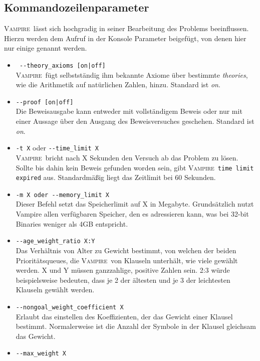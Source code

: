 \documentclass{article}
\newcommand{\vampire}{\textsc{Vampire}~}
\begin{document}
\subsection{Kommandozeilenparameter}
\label{subsec:commands}
\vampire lässt sich hochgradig in seiner Bearbeitung des Problems beeinflussen. Hierzu werden dem Aufruf in der Konsole Parameter beigefügt, von denen hier nur einige genannt werden.
\begin{itemize}
	\item \verb= --theory_axioms [on|off]= \label{arg:theoryaxiomsoff}\\
	\vampire fügt selbstständig ihm bekannte Axiome über bestimmte \emph{theories}, wie die Arithmetik auf natürlichen Zahlen, hinzu. Standard ist \textit{on}.
	\item \verb=--proof [on|off]= \label{arg:proofoff}\\
	Die Beweisausgabe kann entweder mit vollständigem Beweis oder nur mit einer Aussage über den Ausgang des Beweisversuches geschehen. Standard ist \textit{on}.
	\item \verb|-t X| oder \verb|--time_limit X| \label{arg:timelimit}\\
	\vampire bricht nach X Sekunden den Versuch ab das Problem zu lösen. Sollte bis dahin kein Beweis gefunden worden sein, gibt \vampire \texttt{time limit expired} aus. Standardmäßig liegt das Zeitlimit bei 60  Sekunden.
	\item \verb|-m X oder --memory_limit X| \label{arg:memorylimit}\\
	Dieser Befehl setzt das Speicherlimit auf X in Megabyte. Grundsätzlich nutzt Vampire allen verfügbaren Speicher, den es adressieren kann, was bei 32-bit Binaries weniger als 4GB entspricht.
	\item \verb|--age_weight_ratio X:Y| \label{arg:ageweightratio}\\
	Das Verhältnis von Alter zu Gewicht bestimmt, von welchen der beiden Prioritätsqueues, die \vampire von Klauseln unterhält, wie viele gewählt werden. X und Y müssen ganzzahlige, positive Zahlen sein.
	2:3 würde beispielsweise bedeuten, dass je 2 der ältesten und je 3 der leichtesten Klauseln gewählt werden.  
	\item \verb|--nongoal_weight_coefficient X| \label{arg:weightcoefficient}\\
	Erlaubt das einstellen des Koeffizienten, der das Gewicht einer Klausel bestimmt. Normalerweise ist die Anzahl der Symbole in der Klausel gleichsam das Gewicht.
	\item \verb|--max_weight X| \label{arg:maxweight}\\

\end{itemize}
\end{document}
